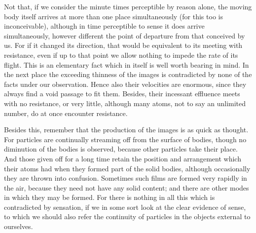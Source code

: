 \documentclass{stex}
\begin{document}
Not that, if we consider the minute times perceptible by reason alone, the moving body itself arrives at more than one place simultaneously (for this too is inconceivable), although in time perceptible to sense it does arrive simultaneously, however different the point of departure from that conceived by us.
For if it changed its direction, that would be equivalent to its meeting with resistance, even if up to that point we allow nothing to impede the rate of its flight.
This is an elementary fact which in itself is well worth bearing in mind.
In the next place the exceeding thinness of the images is contradicted by none of the facts under our observation.
Hence also their velocities are enormous, since they always find a void passage to fit them.
Besides, their incessant effluence meets with no resistance, or very little, although many atoms, not to say an unlimited number, do at once encounter resistance.

Besides this, remember that the production of the images is as quick as thought.
For particles are continually streaming off from the surface of bodies, though no diminution of the bodies is observed, because other particles take their place.
And those given off for a long time retain the position and arrangement which their atoms had when they formed part of the solid bodies, although occasionally they are thrown into confusion.
Sometimes such films are formed very rapidly in the air, because they need not have any solid content; and there are other modes in which they may be formed.
For there is nothing in all this which is contradicted by sensation, if we in some sort look at the clear evidence of sense, to which we should also refer the continuity of particles in the objects external to ourselves.
\end{document}
